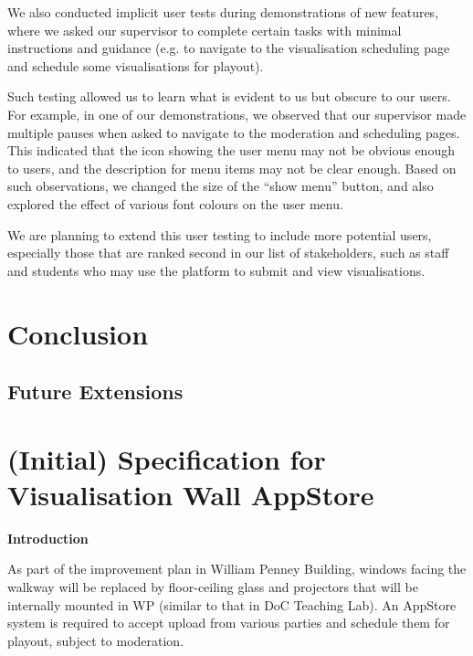 \documentclass[a4paper, titlepage]{article}
\begin{document}
We also conducted implicit user tests during demonstrations of new features, where we asked our supervisor to complete certain tasks with minimal instructions and guidance (e.g. to navigate to the visualisation scheduling page and schedule some visualisations for playout).

Such testing allowed us to learn what is evident to us but obscure to our users. For example, in one of our demonstrations, we observed that our supervisor made multiple pauses when asked to navigate to the moderation and scheduling pages. This indicated that the icon showing the user menu may not be obvious enough to users, and the description for menu items may not be clear enough. Based on such observations, we changed the size of the ``show menu'' button, and also explored the effect of various font colours on the user menu.

We are planning to extend this user testing to include more potential users, especially those that are ranked second in our list of stakeholders, such as staff and students who may use the platform to submit and 
view visualisations.







\newpage
\section{Conclusion}

\subsection{Future Extensions}



\newpage
\appendix

\section{(Initial) Specification for Visualisation Wall AppStore}

\textbf{\Large Introduction}

As part of the improvement plan in William Penney Building, windows facing the walkway will be replaced by floor-ceiling glass and projectors that will be internally mounted in WP (similar to that in DoC Teaching Lab). An AppStore system is required to accept upload from various parties and schedule them for playout, subject to moderation.\\
\end{document}
